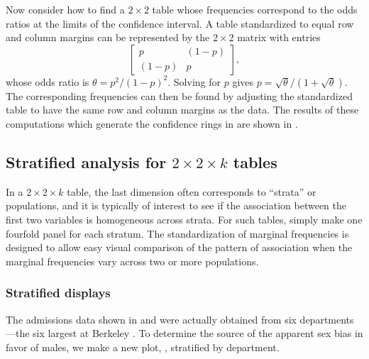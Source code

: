 \documentclass[10pt,krantz2]{krantz}\usepackage[]{graphicx}\usepackage[]{color}
\begin{document}
Now consider how to find a \(2 \times  2\) table whose frequencies
correspond to the odds ratios at the limits of the confidence
interval.  A table standardized to equal row and column margins can
be represented by the \(2 \times  2\) matrix with entries
\begin{equation*}
 \left[
  \begin{array}{cc}
   p & (1-p) \\
  (1-p) & p
  \end{array}
 \right]
 \comma
\end{equation*}
whose odds ratio is \(\theta  =  p^2 /  ( 1  -  p)^2\).
Solving for $p$ gives \(p  =  \sqrt \theta /  ( 1  +  \sqrt \theta )\).  The
corresponding frequencies can then be found by adjusting the
standardized table to have the same row and column margins as the
data. The results of these computations which generate the confidence
rings in  are shown in .





\subsection{Stratified analysis for $2 \times 2 \times k$ tables}\label{sec:twoway-fourstrat}
In a \(2 \times  2 \times  k\)
table, the last dimension often corresponds to ``strata'' or
populations, and it is typically of interest to see if the
association between the first two variables is homogeneous across
strata.  For such tables, simply make one fourfold panel for each
stratum.  The standardization of marginal frequencies is designed to
allow easy visual comparison of the pattern of association
when the marginal frequencies vary across two
or more populations.

\subsubsection{Stratified displays}\label{sec:twoway-stratdisp}

The admissions data shown in
 and  were actually obtained
from six departments---the six largest at Berkeley
\citep{Bickel-etal:75}.
To determine the source of the apparent sex
bias in favor of males, we make a new plot, ,
stratified by department.
\end{document}
